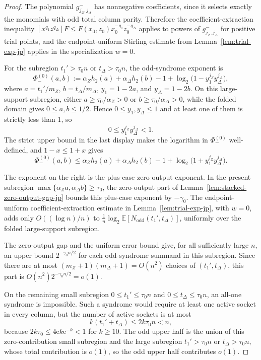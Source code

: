 \documentclass[11pt]{article}
\theoremstyle{definition}
\newcommand{\EE}{\mathbb E}
\newcommand{\h}{h_2}
\begin{document}
\begin{proof}
The polynomial \(g^-_{j_Z,j_\Delta}\) has nonnegative coefficients, since it selects exactly the monomials with odd total column parity. Therefore the coefficient-extraction inequality \([x^{q_1}z^{q_\Delta}]F\le F(x_0,z_0)x_0^{-q_1}z_0^{-q_\Delta}\) applies to powers of \(g^-_{j_Z,j_\Delta}\) for positive trial points, and the endpoint-uniform Stirling estimate from Lemma~\ref{lem:trial-exp-jp} applies in the specialization \(w=0\).

For the subregion \(t_1'>\tau_0 n\) or \(t_\Delta>\tau_0 n\), the odd-syndrome exponent is
\[
\Phi_-^{(0)}(a,b)
:=
\alpha_Z\h(a)+\alpha_\Delta\h(b)-1
+\log_2\!\bigl(1-y_1^{j_Z}y_\Delta^{j_\Delta}\bigr),
\]
where \(a=t_1'/m_Z\), \(b=t_\Delta/m_\Delta\), \(y_1=1-2a\), and \(y_\Delta=1-2b\). On this large-support subregion, either \(a\ge \tau_0/\alpha_Z>0\) or \(b\ge \tau_0/\alpha_\Delta>0\), while the folded domain gives \(0\le a,b\le1/2\). Hence \(0\le y_1,y_\Delta\le1\) and at least one of them is strictly less than \(1\), so
\[
0\le y_1^{j_Z}y_\Delta^{j_\Delta}<1.
\]
The strict upper bound in the last display makes the logarithm in \(\Phi_-^{(0)}\) well-defined, and \(1-x\le 1+x\) gives
\[
\Phi_-^{(0)}(a,b)
\le
\alpha_Z\h(a)+\alpha_\Delta\h(b)-1
+\log_2\!\bigl(1+y_1^{j_Z}y_\Delta^{j_\Delta}\bigr).
\]

The exponent on the right is the plus-case zero-output exponent. In the present subregion \(\max\{\alpha_Za,\alpha_\Delta b\}\ge\tau_0\), the zero-output part of Lemma~\ref{lem:stacked-zero-output-gap-jp} bounds this plus-case exponent by \(-\gamma_0\).
The endpoint-uniform coefficient-extraction estimate in Lemma~\ref{lem:trial-exp-jp}, with \(w=0\), adds only \(O((\log n)/n)\) to \(\frac1n\log_2\EE[N_{\mathrm{odd}}(t_1',t_\Delta)]\), uniformly over the folded large-support subregion.

The zero-output gap and the uniform error bound give, for all sufficiently large \(n\), an upper bound \(2^{-\gamma_0 n/2}\) for each odd-syndrome summand in this subregion. Since there are at most \((m_Z+1)(m_\Delta+1)=O(n^2)\) choices of \((t_1',t_\Delta)\), this part is \(O(n^2)2^{-\gamma_0 n/2}=o(1)\).

On the remaining small subregion \(0\le t_1'\le\tau_0n\) and \(0\le t_\Delta\le\tau_0n\), an all-one syndrome is impossible. Such a syndrome would require at least one active socket in every column, but the number of active sockets is at most
\[
k(t_1'+t_\Delta)\le 2k\tau_0n<n,
\]
because \(2k\tau_0\le4\mathrm{e} k\mathrm{e}^{-k}<1\) for \(k\ge10\). The odd upper half is the union of this zero-contribution small subregion and the large subregion \(t_1'>\tau_0 n\) or \(t_\Delta>\tau_0 n\), whose total contribution is \(o(1)\), so the odd upper half contributes \(o(1)\).


\end{proof}
\end{document}
